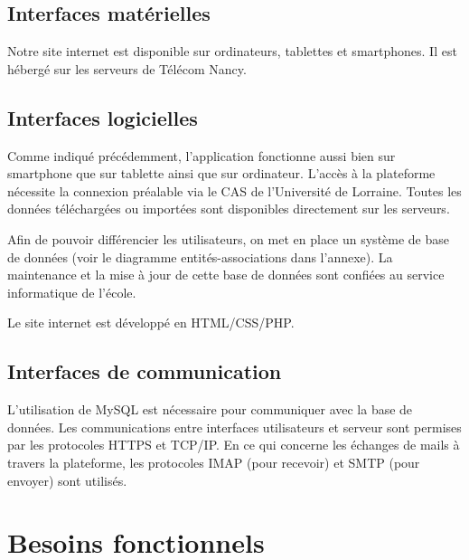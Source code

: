 \documentclass{scrreprt}
\begin{document}
\subsection{Interfaces matérielles}

\hspace{1cm} Notre site internet est disponible sur ordinateurs, tablettes et smartphones. Il est hébergé sur les serveurs de Télécom Nancy.

\subsection{Interfaces logicielles}

\hspace{1cm}Comme indiqué précédemment, l'application fonctionne aussi bien sur smartphone que sur tablette ainsi que sur ordinateur. L'accès à la plateforme nécessite la connexion préalable via le CAS de l'Université de Lorraine. Toutes les données téléchargées ou importées sont disponibles directement sur les serveurs.

\hspace{0,6cm}Afin de pouvoir différencier les utilisateurs, on met en place un système de base de données (voir le diagramme entités-associations dans l'annexe). La maintenance et la mise à jour de cette base de données sont confiées au service informatique de l'école.

\hspace{0,6cm}Le site internet est développé en HTML/CSS/PHP.

\subsection{Interfaces de communication}

\hspace{1cm}L'utilisation de MySQL est nécessaire pour communiquer avec la base de données. Les communications entre interfaces utilisateurs et serveur sont permises par les protocoles HTTPS et TCP/IP. En ce qui concerne les échanges de mails à travers la plateforme, les protocoles IMAP (pour recevoir) et SMTP (pour envoyer) sont utilisés.


\section{Besoins fonctionnels}
\end{document}
